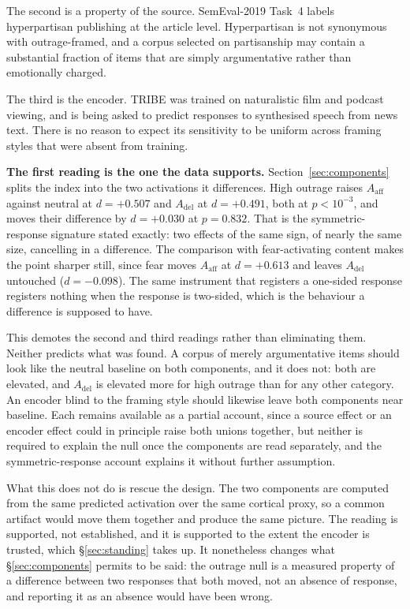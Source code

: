 The second is a property of the source. SemEval-2019 Task~4 labels hyperpartisan publishing
at the article level. Hyperpartisan is not synonymous with outrage-framed, and a corpus
selected on partisanship may contain a substantial fraction of items that are simply
argumentative rather than emotionally charged.

The third is the encoder. TRIBE was trained on naturalistic film and podcast viewing, and is
being asked to predict responses to synthesised speech from news text. There is no reason to
expect its sensitivity to be uniform across framing styles that were absent from training.

\textbf{The first reading is the one the data supports.} Section~\ref{sec:components} splits
the index into the two activations it differences. High outrage raises $A_{\mathrm{aff}}$
against neutral at $d = +0.507$ and $A_{\mathrm{del}}$ at $d = +0.491$, both at $p < 10^{-3}$,
and moves their difference by $d = +0.030$ at $p = 0.832$. That is the symmetric-response
signature stated exactly: two effects of the same sign, of nearly the same size, cancelling in
a difference. The comparison with fear-activating content makes the point sharper still, since
fear moves $A_{\mathrm{aff}}$ at $d = +0.613$ and leaves $A_{\mathrm{del}}$ untouched
($d = -0.098$). The same instrument that registers a one-sided response registers nothing when
the response is two-sided, which is the behaviour a difference is supposed to have.

This demotes the second and third readings rather than eliminating them. Neither predicts what
was found. A corpus of merely argumentative items should look like the neutral baseline on
both components, and it does not: both are elevated, and $A_{\mathrm{del}}$ is elevated more
for high outrage than for any other category. An encoder blind to the framing style should
likewise leave both components near baseline. Each remains available as a partial account,
since a source effect or an encoder effect could in principle raise both unions together, but
neither is required to explain the null once the components are read separately, and the
symmetric-response account explains it without further assumption.

What this does not do is rescue the design. The two components are computed from the same
predicted activation over the same cortical proxy, so a common artifact would move them
together and produce the same picture. The reading is supported, not established, and it is
supported to the extent the encoder is trusted, which \S\ref{sec:standing} takes up. It
nonetheless changes what \S\ref{sec:components} permits to be said: the outrage null is a
measured property of a difference between two responses that both moved, not an absence of
response, and reporting it as an absence would have been wrong.

